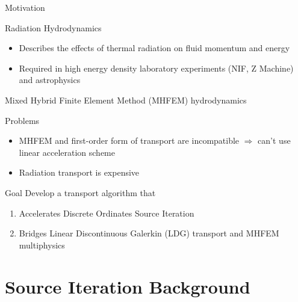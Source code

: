 \documentclass[10pt,draft]{beamer}
\begin{document}

\begin{frame}{Motivation}

	\footnotesize
	Radiation Hydrodynamics 
	\vspace{-.05in}
	\begin{itemize}
		\item Describes the effects of thermal radiation on fluid momentum and energy 
		\item Required in high energy density laboratory experiments (NIF, Z Machine) and astrophysics 
	\end{itemize}

	Mixed Hybrid Finite Element Method (MHFEM) hydrodynamics 

	Problems
	\vspace{-.05in}
		\begin{itemize}
			\item MHFEM and first-order form of transport are incompatible $\Rightarrow$ can't use linear acceleration scheme 
			\item Radiation transport is expensive 
		\end{itemize}

	\begin{block}{Goal}
		Develop a transport algorithm that 
			\begin{enumerate} \vspace{-.05in}
				\item \alert<2>{Accelerates Discrete Ordinates Source Iteration}
				\item Bridges Linear Discontinuous Galerkin (LDG) transport and MHFEM multiphysics
			\end{enumerate}
		\vspace{-.05in}
	\end{block}

\end{frame}

\section{Source Iteration Background}
\end{document}
